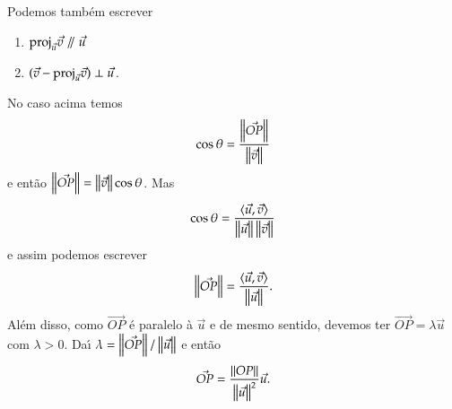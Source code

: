 Podemos tamb\'em escrever
\begin{enumerate}
  \item $\proj_{\vec{u}}\vec{v} \varparallel\vec{u}$
    \item $(\vec{v} - {\rm proj}_{\vec{u}}\vec{v}) \perp \vec{u}$.
\end{enumerate}

No caso acima temos
\[
  \cos\theta = \dfrac{\left\Vert{\vec{OP}}\right\Vert}{\left\Vert{\vec{v}}\right\Vert}
\]
e ent\~ao $\left\Vert{\vec{OP}}\right\Vert = \left\Vert{\vec{v}}\right\Vert\cos\theta$. Mas
\[
  \cos\theta = \dfrac{\langle \vec{u}, \vec{v} \rangle}{\left\Vert{\vec{u}}\right\Vert\left\Vert{\vec{v}}\right\Vert}
\]
e assim podemos escrever
\[
  \left\Vert{\vec{OP}}\right\Vert = \dfrac{\langle \vec{u}, \vec{v} \rangle}{\left\Vert{\vec{u}}\right\Vert}.
\]
Al\'em disso, como $\vec{OP}$ \'e paralelo \`a $\vec{u}$ e de mesmo sentido, devemos ter $\vec{OP} = \lambda\vec{u}$ com $\lambda > 0$. Da{\'\i}
$\lambda = \left\Vert{\vec{OP}}\right\Vert/\left\Vert{\vec{u}}\right\Vert$ e ent\~ao
\[
  \vec{OP} = \dfrac{\left\Vert{OP}\right\Vert}{\left\Vert{\vec{u}}\right\Vert^2}\vec{u}.
\]

